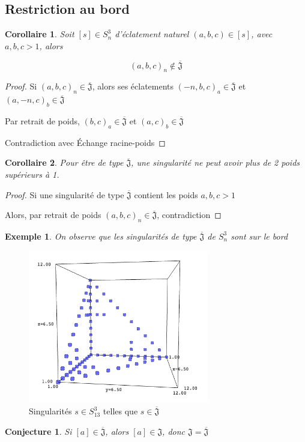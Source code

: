 \documentclass{article}
\newtheorem{conjecture}{Conjecture}
\newtheorem{example}{Exemple}
\newtheorem{corollary}{Corollaire}
\newcommand{\J}{\mathfrak{J}}
\newcommand{\JS}{\overline{\J}}
\begin{document}
\subsection{Restriction au bord}

\begin{corollary}
    Soit $[s] \in S_n^3$ d'éclatement naturel $(a, b, c) \in [s]$, avec $a, b, c > 1$, alors
    
    \[ {(a, b, c)}_n \not \in \JS \]
\end{corollary}

\begin{proof}
    Si ${(a, b, c)}_n \in \JS$, alors ses éclatements ${(-n, b, c)}_a \in \JS$ et ${(a, -n, c)}_b \in \JS$

    Par retrait de poids, ${(b, c)}_a \in \JS$ et ${(a, c)}_b \in \JS$

    Contradiction avec Échange racine-poids
\end{proof}

\begin{corollary}
    Pour être de type $\JS$, une singularité ne peut avoir plus de 2 poids supérieurs à 1.
\end{corollary}

\begin{proof}
    Si une singularité de type $\JS$ contient les poids $a, b, c > 1$
    
    Alors, par retrait de poids ${(a, b, c)}_n \in \JS$, contradiction
\end{proof}

\begin{example}
    On observe que les singularités de type $\JS$ de $S_n^3$ sont sur le bord
\end{example}
\begin{figure}[h]
    \caption{Singularités $s \in S_{13}^3$ telles que $s \in \JS$}
    \centering
    \includegraphics[width=0.7\textwidth]{singularite_j_strict_m3_n13}
\end{figure}

\begin{conjecture}
    Si $[a] \in \JS$, alors $[a] \in \J$, donc $\J = \JS$
\end{conjecture}
\end{document}
